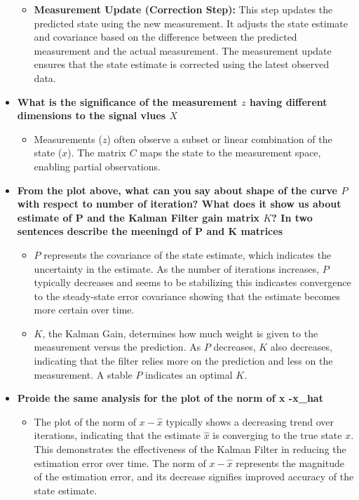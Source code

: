 \documentclass{article}
\begin{document}
\begin{itemize}
\begin{itemize}
        \item \textbf{Measurement Update (Correction Step):} This step updates the predicted state using 
        the new measurement. It adjusts the state estimate and covariance based on 
        the difference between the predicted measurement and the actual measurement. 
        The measurement update ensures that the state estimate is corrected using the latest observed data.
    \end{itemize}
    \item \textbf{What is the significance of the measurement \(z\) having different dimensions to the signal vlues \(X\)}
    \begin{itemize}
        \item Measurements (\(z\)) often observe a subset or linear combination of the state (\(x\)). The matrix \(C\) maps the state to the measurement space, enabling partial observations.
    \end{itemize}
    \item \textbf{From the plot above, what can you say about shape of the curve \(P\) with respect to number of iteration? What does it show us about
    estimate of P and the Kalman Filter gain matrix \(K\)? In two sentences describe the meeningd of P and K matrices}
    \begin{itemize}
        \item \(P\) represents the covariance of the state estimate, which indicates the uncertainty in the estimate. 
        As the number of iterations increases, \(P\) typically decreases and seems to be stabilizing this indicastes convergence to the steady-state error covariance showing that the estimate becomes more certain over time.
        \item \(K\), the Kalman Gain, determines how much weight is given to the measurement versus the prediction. 
        As \(P\) decreases, \(K\) also decreases, indicating that the filter relies more on the prediction and less on the measurement. A stable \(P\) indicates an optimal \(K\).
    \end{itemize}
    \item \textbf{Proide the same analysis for the plot of the norm of x -x\_hat}
    \begin{itemize}
        \item The plot of the norm of \(x - \hat{x}\) typically shows a decreasing trend over iterations, indicating that the estimate \(\hat{x}\) is converging to the true state \(x\). This demonstrates the effectiveness of the Kalman Filter in reducing the estimation error over time. The norm of \(x - \hat{x}\) represents the magnitude of the estimation error, and its decrease signifies improved accuracy of the state estimate.
    \end{itemize}
    
\end{itemize}
\end{document}
